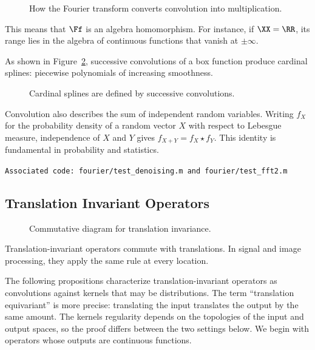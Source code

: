 \begin{figure}[tbp]
\centering
{}
\caption{How the Fourier transform converts convolution into multiplication.}
\label{fig-review-fourier-convolution-fourier}
\end{figure}
This means that $\Ff$ is an algebra homomorphism. For instance, if $\XX=\RR$, its range lies in the algebra of continuous functions that vanish at $\pm\infty$.

As shown in Figure~\ref{fig-splines}, successive convolutions of a box function produce cardinal splines: piecewise polynomials of increasing smoothness.

\begin{figure}[tbp]
\centering
{}
\caption{Cardinal splines are defined by successive convolutions.}
\label{fig-splines}
\end{figure}


Convolution also describes the sum of independent random variables. Writing $f_X$ for the probability density of a random vector $X$ with respect to Lebesgue measure, independence of $X$ and $Y$ gives $f_{X+Y}=f_X \star f_Y$. This identity is fundamental in probability and statistics.


\texttt{Associated code: fourier/test\_denoising.m and fourier/test\_fft2.m}

\subsection{Translation Invariant Operators}

\begin{figure}[tbp]
\centering
{}
\caption{Commutative diagram for translation invariance.}
\label{fig-review-fourier-translation-inv}
\end{figure}
Translation-invariant operators commute with translations. In signal and image processing, they apply the same rule at every location.

The following propositions characterize translation-invariant operators as convolutions against kernels that may be distributions. The term ``translation equivariant'' is more precise: translating the input translates the output by the same amount.
%
The kernel\textquotesingle s regularity depends on the topologies of the input and output spaces, so the proof differs between the two settings below.
%
We begin with operators whose outputs are continuous functions.

